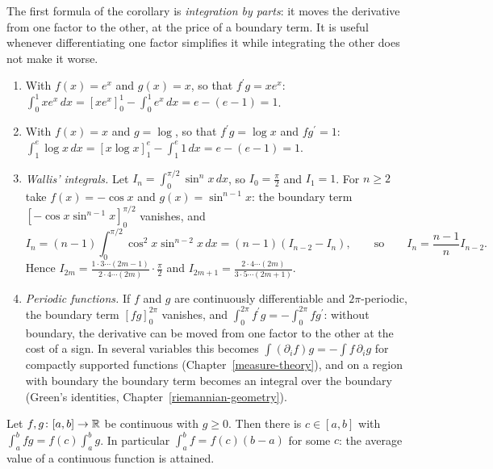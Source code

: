 The first formula of the corollary is \emph{integration by parts}: it moves the derivative from one factor to the other, at the price of a boundary term. It is useful whenever differentiating
one factor simplifies it while integrating the other does not make it worse.

\begin{example}\label{real-analysis:example-integration-by-parts}
\begin{enumerate}
\item With $f(x) = e^x$ and $g(x) = x$, so that $f^{\prime}g = xe^x$: $\int_0^1xe^x\,dx = [xe^x]_0^1 - \int_0^1e^x\,dx = e - (e - 1) = 1$.
\item With $f(x) = x$ and $g = \log$, so that $f^{\prime}g = \log x$ and $fg^{\prime} = 1$: $\int_1^e\log x\,dx = [x\log x]_1^e - \int_1^e1\,dx = e - (e - 1) = 1$.
\item \emph{Wallis' integrals.} Let $I_n = \int_0^{\pi/2}\sin^nx\,dx$, so $I_0 = \frac\pi2$ and $I_1 = 1$. For $n \geq 2$ take $f(x) = -\cos x$ and $g(x) = \sin^{n-1}x$: the boundary term
$[-\cos x\sin^{n-1}x]_0^{\pi/2}$ vanishes, and
\[
I_n = (n - 1)\int_0^{\pi/2}\cos^2x\sin^{n-2}x\,dx = (n - 1)(I_{n-2} - I_n), \qquad\text{so}\qquad I_n = \frac{n - 1}{n}I_{n-2} .
\]
Hence $I_{2m} = \frac{1 \cdot 3 \cdots (2m-1)}{2 \cdot 4 \cdots (2m)}\cdot\frac\pi2$ and $I_{2m+1} = \frac{2 \cdot 4 \cdots (2m)}{3 \cdot 5 \cdots (2m+1)}$.
\item \emph{Periodic functions.} If $f$ and $g$ are continuously differentiable and $2\pi$-periodic, the boundary term $[fg]_0^{2\pi}$ vanishes, and $\int_0^{2\pi}f^{\prime}g = -\int_0^{2\pi}fg^{\prime}$:
without boundary, the derivative can be moved from one factor to the other at the cost of a sign. In several variables this becomes $\int(\partial_if)g = -\int f\,\partial_ig$ for compactly supported
functions (Chapter~\ref{measure-theory}), and on a region with boundary the boundary term becomes an integral over the boundary (Green's identities, Chapter~\ref{riemannian-geometry}).
\end{enumerate}
\end{example}

\begin{proposition}\label{real-analysis:proposition-mean-value-integrals}
Let $f, g \colon [a, b] \to \mathbb{R}$ be continuous with $g \geq 0$. Then there is $c \in [a, b]$ with $\int_a^bfg = f(c)\int_a^bg$. In particular $\int_a^bf = f(c)(b - a)$ for some $c$: the average
value of a continuous function is attained.
\end{proposition}

